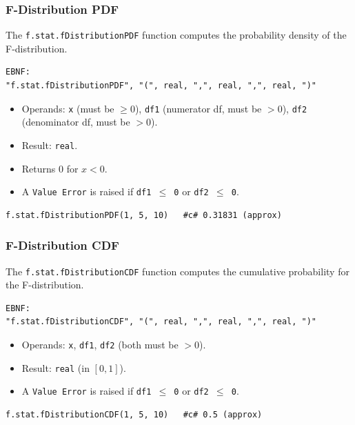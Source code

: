 \subsubsection{F-Distribution PDF}
The \texttt{f.stat.fDistributionPDF} function computes the probability density of the F-distribution.
\begin{verbatim}
EBNF:
"f.stat.fDistributionPDF", "(", real, ",", real, ",", real, ")"
\end{verbatim}
\begin{itemize}
\item Operands: \texttt{x} (must be $\geq 0$), \texttt{df1} (numerator df, must be $> 0$), \texttt{df2} (denominator df, must be $> 0$).
\item Result: \texttt{real}.
\item Returns 0 for $x < 0$.
\item A \texttt{Value Error} is raised if \texttt{df1 $\leq$ 0} or \texttt{df2 $\leq$ 0}.
\end{itemize}
\begin{verbatim}
f.stat.fDistributionPDF(1, 5, 10)   #c# 0.31831 (approx)
\end{verbatim}

\subsubsection{F-Distribution CDF}
The \texttt{f.stat.fDistributionCDF} function computes the cumulative probability for the F-distribution.
\begin{verbatim}
EBNF:
"f.stat.fDistributionCDF", "(", real, ",", real, ",", real, ")"
\end{verbatim}
\begin{itemize}
\item Operands: \texttt{x}, \texttt{df1}, \texttt{df2} (both must be $> 0$).
\item Result: \texttt{real} (in $[0, 1]$).
\item A \texttt{Value Error} is raised if \texttt{df1 $\leq$ 0} or \texttt{df2 $\leq$ 0}.
\end{itemize}
\begin{verbatim}
f.stat.fDistributionCDF(1, 5, 10)   #c# 0.5 (approx)
\end{verbatim}

